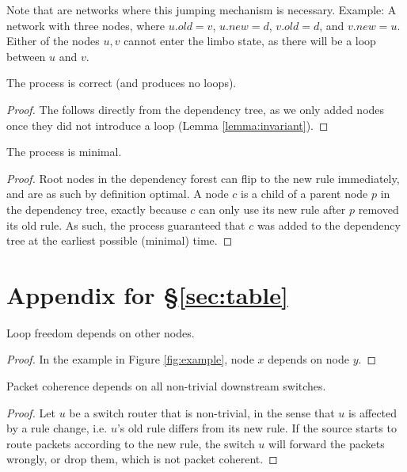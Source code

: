 Note that are networks where this jumping mechanism is necessary. Example: A network with three nodes, where $u.old = v$, $u.new = d$, $v.old = d$, and $v.new = u$. Either of the nodes $u,v$ cannot enter the limbo state, as there will be a loop between $u$ and $v$.

\begin{lemma}\label{lemma:correctness} The process is correct (and produces no loops).
\end{lemma}

\begin{proof} The follows directly from the dependency tree, as we only added nodes once they did not introduce a loop (Lemma \ref{lemma:invariant}).
\end{proof}

\begin{lemma}\label{lemma:minimal} The process is minimal.
\end{lemma}

\begin{proof}
Root nodes in the dependency forest can flip to the new rule immediately, and are as such by definition optimal. A node $c$ is a child of a parent node $p$ in the dependency tree, exactly because $c$ can only use its new rule after $p$ removed its old rule. As such, the process guaranteed that $c$ was added to the dependency tree at the earliest possible (minimal) time.
\end{proof}

\section{Appendix for \S\ref{sec:table}}
\label{sec:app2}


\begin{lemma}\label{lemma:imp loop-free} Loop freedom depends on other nodes.
\end{lemma}

\begin{proof}
In the example in Figure \ref{fig:example}, node $x$ depends on node $y$.
\end{proof}

\begin{lemma}\label{lemma:imp packet coherence} Packet coherence depends on all non-trivial downstream switches.
\end{lemma}

\begin{proof} Let $u$ be a switch router that is non-trivial, in the sense that $u$ is affected by a rule change, i.e. $u$'s old rule differs from its new rule. If the source starts to route packets according to the new rule, the switch $u$ will forward the packets wrongly, or drop them, which is not packet coherent.
\end{proof}

